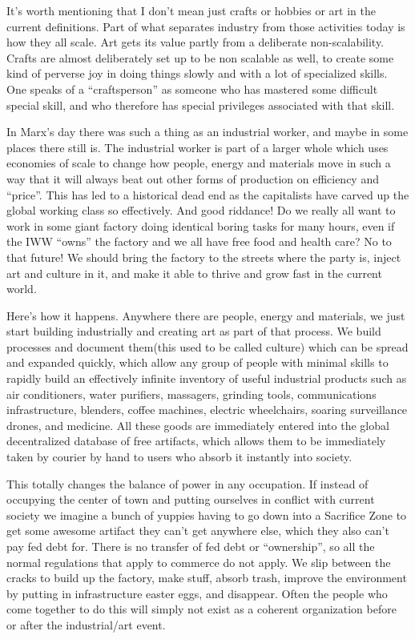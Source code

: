 It's worth mentioning that I don't mean just crafts or hobbies or art in
the current definitions. Part of what separates industry from those
activities today is how they all scale. Art gets its value partly from a
deliberate non-scalability. Crafts are almost deliberately set up to be
non scalable as well, to create some kind of perverse joy in doing
things slowly and with a lot of specialized skills. One speaks of a
``craftsperson'' as someone who has mastered some difficult special
skill, and who therefore has special privileges associated with that
skill.

In Marx's day there was such a thing as an industrial worker, and maybe
in some places there still is. The industrial worker is part of a larger
whole which uses economies of scale to change how people, energy and
materials move in such a way that it will always beat out other forms of
production on efficiency and ``price''. This has led to a historical
dead end as the capitalists have carved up the global working class so
effectively. And good riddance! Do we really all want to work in some
giant factory doing identical boring tasks for many hours, even if the
IWW ``owns'' the factory and we all have free food and health care? No
to that future! We should bring the factory to the streets where the
party is, inject art and culture in it, and make it able to thrive and
grow fast in the current world.

Here's how it happens. Anywhere there are people, energy and materials,
we just start building industrially and creating art as part of that
process. We build processes and document them(this used to be called
culture) which can be spread and expanded quickly, which allow any group
of people with minimal skills to rapidly build an effectively infinite
inventory of useful industrial products such as air conditioners, water
purifiers, massagers, grinding tools, communications infrastructure,
blenders, coffee machines, electric wheelchairs, soaring surveillance
drones, and medicine. All these goods are immediately entered into the
global decentralized database of free artifacts, which allows them to be
immediately taken by courier by hand to users who absorb it instantly
into society.

This totally changes the balance of power in any occupation. If instead
of occupying the center of town and putting ourselves in conflict with
current society we imagine a bunch of yuppies having to go down into a
Sacrifice Zone to get some awesome artifact they can't get anywhere
else, which they also can't pay fed debt for. There is no transfer of
fed debt or ``ownership'', so all the normal regulations that apply to
commerce do not apply. We slip between the cracks to build up the
factory, make stuff, absorb trash, improve the environment by putting in
infrastructure easter eggs, and disappear. Often the people who come
together to do this will simply not exist as a coherent organization
before or after the industrial/art event.

